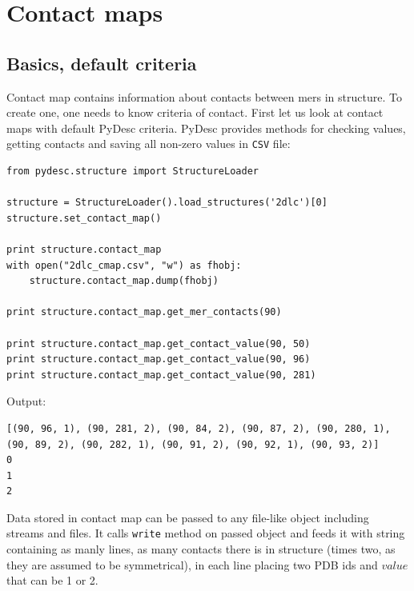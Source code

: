 \documentclass{article}
\begin{document}

\section{Contact maps} \label{CMAPsec}

\subsection{Basics, default criteria}

Contact map contains information about contacts between mers in structure. To create one, one needs to know criteria of contact. First let us look at contact maps with default PyDesc criteria. PyDesc provides methods for checking values, getting contacts and saving all non-zero values in \texttt{CSV} file:
\begin{lstlisting}
from pydesc.structure import StructureLoader

structure = StructureLoader().load_structures('2dlc')[0]
structure.set_contact_map()

print structure.contact_map
with open("2dlc_cmap.csv", "w") as fhobj:
    structure.contact_map.dump(fhobj)

print structure.contact_map.get_mer_contacts(90)

print structure.contact_map.get_contact_value(90, 50)
print structure.contact_map.get_contact_value(90, 96)
print structure.contact_map.get_contact_value(90, 281)
\end{lstlisting}
Output:
\begin{lstlisting}
[(90, 96, 1), (90, 281, 2), (90, 84, 2), (90, 87, 2), (90, 280, 1), (90, 89, 2), (90, 282, 1), (90, 91, 2), (90, 92, 1), (90, 93, 2)]
0
1
2
\end{lstlisting}


Data stored in contact map can be passed to any file-like object including streams and files. It calls \texttt{write} method on passed object and feeds it with string containing as manly lines, as many contacts there is in structure (times two, as they are assumed to be symmetrical), in each line placing two PDB ids and $value$ that can be 1 or 2.
\end{document}

